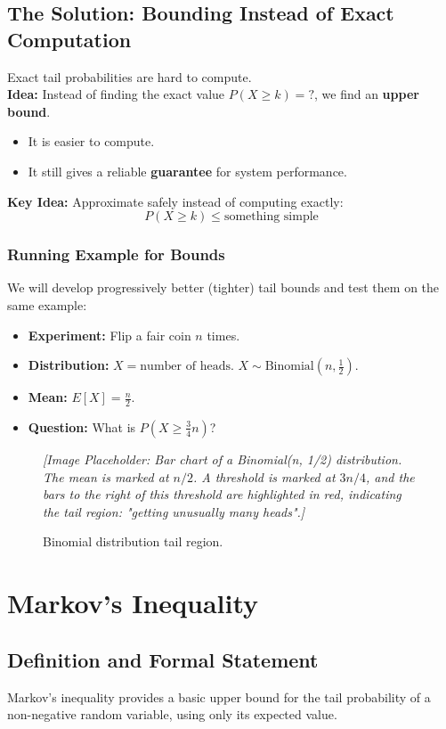 \documentclass{article}
\begin{document}
\subsection{The Solution: Bounding Instead of Exact Computation}
Exact tail probabilities are hard to compute. \\
\textbf{Idea:} Instead of finding the exact value $P(X \ge k) = ?$, we find an \textbf{upper bound}.
\begin{itemize}
    \item It is easier to compute.
    \item It still gives a reliable \textbf{guarantee} for system performance.
\end{itemize}

\textbf{Key Idea:} Approximate safely instead of computing exactly:
\[ P(X \ge k) \le \text{something simple} \]

\subsubsection{Running Example for Bounds}
We will develop progressively better (tighter) tail bounds and test them on the same example:
\begin{itemize}
    \item \textbf{Experiment:} Flip a fair coin $n$ times.
    \item \textbf{Distribution:} $X = \text{number of heads}$. $X \sim \text{Binomial}(n, \frac{1}{2})$.
    \item \textbf{Mean:} $E[X] = \frac{n}{2}$.
    \item \textbf{Question:} What is $P(X \ge \frac{3}{4}n)$?
\end{itemize}

\begin{figure}[h]
    \centering
    \textit{[Image Placeholder: Bar chart of a Binomial(n, 1/2) distribution. The mean is marked at $n/2$. A threshold is marked at $3n/4$, and the bars to the right of this threshold are highlighted in red, indicating the tail region: "getting unusually many heads".]}
    \caption{Binomial distribution tail region.}
\end{figure}

\section{Markov's Inequality}

\subsection{Definition and Formal Statement}
Markov's inequality provides a basic upper bound for the tail probability of a non-negative random variable, using only its expected value.
\end{document}
